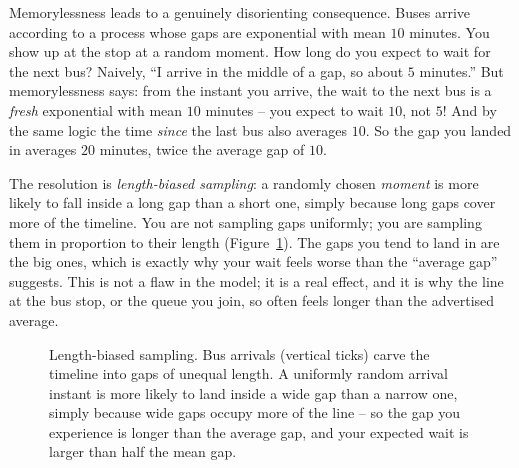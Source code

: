 \begin{paradoxbox}
Memorylessness leads to a genuinely disorienting consequence. Buses arrive
according to a process whose gaps are exponential with mean $10$ minutes. You
show up at the stop at a random moment. How long do you expect to wait for the
next bus? Naively, ``I arrive in the middle of a gap, so about $5$ minutes.''
But memorylessness says: from the instant you arrive, the wait to the next bus
is a \emph{fresh} exponential with mean $10$ minutes -- you expect to wait
$10$, not $5$! And by the same logic the time \emph{since} the last bus also
averages $10$. So the gap you landed in averages $20$ minutes, twice the
average gap of $10$.

The resolution is \emph{length-biased sampling}: a randomly chosen \emph{moment}
is more likely to fall inside a long gap than a short one, simply because long
gaps cover more of the timeline. You are not sampling gaps uniformly; you are
sampling them in proportion to their length (Figure~\ref{ch11:fig-lengthbias}).
The gaps you tend to land in are the big ones, which is exactly why your wait feels worse than the ``average
gap'' suggests. This is not a flaw in the model; it is a real effect, and it is
why the line at the bus stop, or the queue you join, so often feels longer than
the advertised average.
\end{paradoxbox}

\begin{figure}[H]
\centering
{}
\caption{Length-biased sampling. Bus arrivals (vertical ticks) carve the timeline
into gaps of unequal length. A uniformly random arrival instant is more likely to
land inside a wide gap than a narrow one, simply because wide gaps occupy more of
the line -- so the gap you experience is longer than the average gap, and your
expected wait is larger than half the mean gap.}
\label{ch11:fig-lengthbias}
\end{figure}

